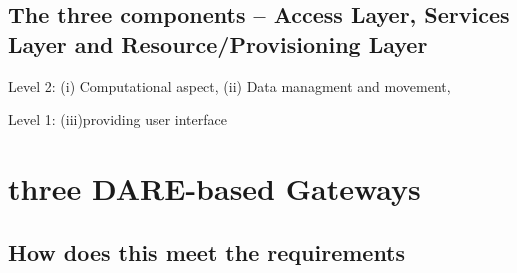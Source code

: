 \documentclass[12pt]{article}
\begin{document}
\subsection{The three components -- Access Layer, Services Layer and
  Resource/Provisioning Layer} 

Level 2: (i) Computational aspect, (ii) Data managment and movement, 

Level 1: (iii)providing user interface

\section{three DARE-based Gateways}

\subsection{How does this meet the requirements}



\end{document}
